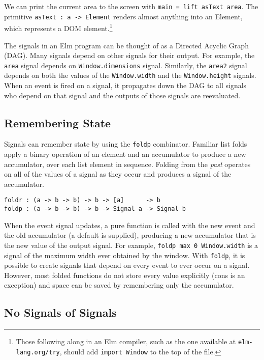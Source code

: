 \documentclass{article}
\begin{document}
We can print the current area to the screen with \texttt{main = lift asText
area}. The primitive \texttt{asText : a -\textgreater{} Element} renders almost
anything into an Element, which represents a DOM element.\footnote{Those
    following along in an Elm compiler, such as the one available at
    \texttt{elm-lang.org/try}, should add \texttt{import Window} to the top of
the file.}

The signals in an Elm program can be thought of as a Directed Acyclic
Graph (DAG). Many signals depend on other signals for their output. For
example, the \texttt{area} signal depends on \texttt{Window.dimensions}
signal. Similarly, the \texttt{area2} signal depends on both the values
of the \texttt{Window.width} and the \texttt{Window.height} signals.
When an event is fired on a signal, it propagates down the DAG to all
signals who depend on that signal and the outputs of those signals are
reevaluated.

\subsection{Remembering State}\label{remembering-state}

Signals can remember state by using the \texttt{foldp} combinator.
Familiar list folds apply a binary operation of an element and an
accumulator to produce a new accumulator, over each list element in
sequence. Folding from the \emph{past} operates on all of the values of
a signal as they occur and produces a signal of the accumulator.

\begin{verbatim}
foldr : (a -> b -> b) -> b -> [a]      -> b
foldp : (a -> b -> b) -> b -> Signal a -> Signal b
\end{verbatim}

When the event signal updates, a pure function is called with the new
event and the old accumulator (a default is supplied), producing a new
accumulator that is the new value of the output signal. For example,
\texttt{foldp max 0 Window.width} is a signal of the maximum width ever
obtained by the window. With \texttt{foldp}, it is possible to create
signals that depend on every event to ever occur on a signal. However,
most folded functions do not store every value explicitly (cons is an
exception) and space can be saved by remembering only the accumulator.

\subsection{No Signals of Signals}\label{no-signals-of-signals}
\end{document}
